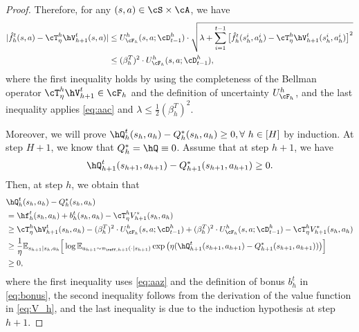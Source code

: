 \documentclass[11pt]{article}
\newcommand{\E}{\mathbb E}
\begin{document}
\begin{proof}
    Therefore, for any $(s,a)\in\cS\times\cA$, we have
    \begin{align}\label{eq:aaz}
        | \hat f^t_h(s, a) - \cT_\eta^h \hV^t_{h+1}(s, a) | &\le U^h_{\cF_h}(s, a; \cD^h_{t-1}) \cdot \sqrt{\lambda + \sum_{i = 1}^{t - 1} \big[\hat f^t_h (s_h^i, a_h^i) - \cT_\eta^h \hV^t_{h+1}(s_h^i, a_h^i)\big]^2}\notag\\
        &\le (\beta_h^T)^2\cdot U^h_{\cF_h}(s, a; \cD^h_{t-1}),
    \end{align}
    where the first inequality holds by using the completeness of the Bellman operator $\cT_\eta^h \hV^t_{h+1}\in\cF_h$ and the definition of uncertainty $U^h_{\cF_h}$, and the last inequality applies \eqref{eq:aac} and $\lambda\le \frac{1}{2}(\beta^T_h)^2$.

Moreover, we will prove $\hQ^t_h(s_h,a_h)-Q^*_h(s_h,a_h) \ge 0,\forall~h\in[H]$ by induction. At step $H+1$, we know that $Q^*_h=\hQ\equiv0$. Assume that at step $h+1$, we have
$$
\hQ^t_{h+1}(s_{h+1},a_{h+1})-Q^*_{h+1}(s_{h+1},a_{h+1}) \ge 0.
$$
Then, at step $h$, we obtain that
\begin{align*}
    &\hQ^t_h(s_h,a_h)-Q^*_h(s_h,a_h) \\&= \hf^t_h(s_h,a_h) + b_h^t(s_h,a_h) - \cT_\eta^h V_{h+1}^*(s_h,a_h)\\
    &\ge \cT_\eta^h\hV_{h+1}^t(s_h,a_h) - (\beta_h^T)^2\cdot U^h_{\cF_h}(s, a; \cD^h_{t-1}) + (\beta_h^T)^2\cdot U^h_{\cF_h}(s, a; \cD^h_{t-1}) - \cT_\eta^h V_{h+1}^*(s_h,a_h)\\
    &\ge \frac{1}{\eta}\E_{s_{h+1}|s_h,a_h} \Big[\log\E_{a_{h+1}\sim \pi_{\reff,h+1}(\cdot|s_{h+1})} \exp\big(\eta(\hQ_{h+1}^t(s_{h+1},a_{h+1}) - Q_{h+1}^*(s_{h+1},a_{h+1}))\big)\Big]\\
    &\ge 0,
\end{align*}
where the first inequality uses \eqref{eq:aaz} and the definition of bonus $b_h^t$ in \eqref{eq:bonus}, the second inequality follows from the derivation of the value function in \eqref{eq:V_h}, and the last inequality is due to the induction hypothesis at step $h+1$.
\end{proof}
\end{document}
